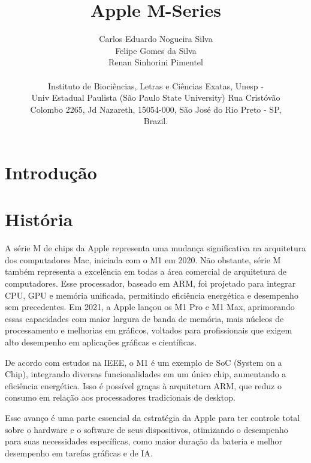 \documentclass[a4paper,times,12pt]{article}
\begin{document}
\title{Apple M-Series}
\author{Carlos Eduardo Nogueira Silva\\Felipe Gomes da Silva \\Renan Sinhorini Pimentel\\ \\Instituto de Bioci\^{e}ncias, Letras e Ci\^{e}ncias Exatas, Unesp - \\ Univ Estadual Paulista (S\~{a}o Paulo State University) Rua Crist\'{o}v\~{a}o \\ Colombo 2265, Jd Nazareth, 15054-000, S\~{a}o Jos\'{e} do Rio Preto - SP, \\ Brazil.}
\maketitle

\section{Introdução}
\hspace*{+15pt} 

\section{História}
\hspace*{+15pt} 
A série M de chips da Apple representa uma mudança significativa na arquitetura dos computadores Mac, iniciada com o M1 em 2020. Não obstante, série M também representa a excelência em todas a área comercial de arquitetura de computadores. Esse processador, baseado em ARM, foi projetado para integrar CPU, GPU e memória unificada, permitindo eficiência energética e desempenho sem precedentes. Em 2021, a Apple lançou os M1 Pro e M1 Max, aprimorando essas capacidades com maior largura de banda de memória, mais núcleos de processamento e melhorias em gráficos, voltados para profissionais que exigem alto desempenho em aplicações gráficas e científicas.

De acordo com estudos na IEEE, o M1 é um exemplo de SoC (System on a Chip), integrando diversas funcionalidades em um único chip, aumentando a eficiência energética. Isso é possível graças à arquitetura ARM, que reduz o consumo em relação aos processadores tradicionais de desktop.

Esse avanço é uma parte essencial da estratégia da Apple para ter controle total sobre o hardware e o software de seus dispositivos, otimizando o desempenho para suas necessidades específicas, como maior duração da bateria e melhor desempenho em tarefas gráficas e de IA.
\end{document}
